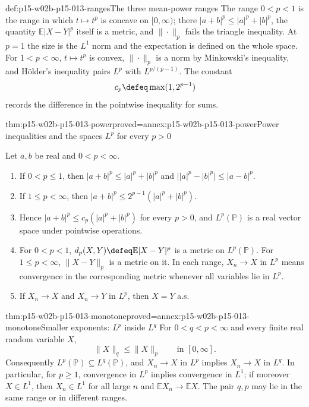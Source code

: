 \begin{hbconvention}{def:p15-w02b-p15-013-ranges}{The three mean-power ranges}
The range \(0<p<1\) is the range in which \(t\mapsto t^p\) is concave on
\([0,\infty)\); there \(|a+b|^p\leq|a|^p+|b|^p\), the quantity
\(\mathbb E|X-Y|^p\) itself is a metric, and \(\|\cdot\|_p\) fails the
triangle inequality. At \(p=1\) the size is the \(L^1\) norm and the
expectation is defined on the whole space. For \(1<p<\infty\),
\(t\mapsto t^p\) is convex, \(\|\cdot\|_p\) is a norm by Minkowski's
inequality, and H\"older's inequality pairs \(L^p\) with
\(L^{p/(p-1)}\). The constant
\[
 c_p\defeq\max(1,2^{p-1})
\]
records the difference in the pointwise inequality for sums.
\end{hbconvention}

\begin{hbtheorem}{thm:p15-w02b-p15-013-power}{proved=annex:p15-w02b-p15-013-power}{Power inequalities and the spaces \(L^p\) for every \(p>0\)}
\par\nobreak
Let \(a,b\) be real and \(0<p<\infty\).
\begin{enumerate}
\item If \(0<p\leq1\), then \(|a+b|^p\leq|a|^p+|b|^p\) and
      \(\bigl||a|^p-|b|^p\bigr|\leq|a-b|^p\).
\item If \(1\leq p<\infty\), then
      \(|a+b|^p\leq2^{p-1}(|a|^p+|b|^p)\).
\item Hence \(|a+b|^p\leq c_p(|a|^p+|b|^p)\) for every \(p>0\), and
      \(L^p(\mathbb P)\) is a real vector space under pointwise
      operations.
\item For \(0<p<1\), \(d_p(X,Y)\defeq\mathbb E|X-Y|^p\) is a metric on
      \(L^p(\mathbb P)\). For \(1\leq p<\infty\),
      \(\|X-Y\|_p\) is a metric on it. In each range, \(X_n\to X\) in
      \(L^p\) means convergence in the corresponding metric whenever all
      variables lie in \(L^p\).
\item If \(X_n\to X\) and \(X_n\to Y\) in \(L^p\), then \(X=Y\) a.s.
\end{enumerate}
\end{hbtheorem}

\begin{hbtheorem}{thm:p15-w02b-p15-013-monotone}{proved=annex:p15-w02b-p15-013-monotone}{Smaller exponents: \(L^p\) inside \(L^q\)}
For \(0<q<p<\infty\) and every finite real random variable \(X\),
\[
 \|X\|_q\leq\|X\|_p\qquad\text{in }[0,\infty].
\]
Consequently \(L^p(\mathbb P)\subseteq L^q(\mathbb P)\), and
\(X_n\to X\) in \(L^p\) implies \(X_n\to X\) in \(L^q\). In particular,
for \(p\geq1\), convergence in \(L^p\) implies convergence in \(L^1\);
if moreover \(X\in L^1\), then \(X_n\in L^1\) for all large \(n\) and
\(\mathbb EX_n\to\mathbb EX\). The pair \(q,p\) may lie in
the same range or in different ranges.
\end{hbtheorem}

